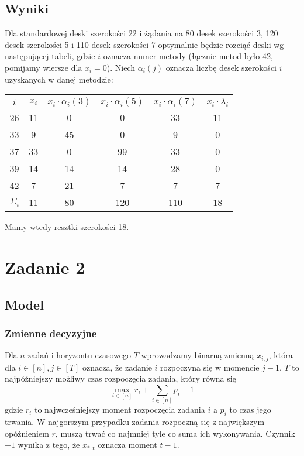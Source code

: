 \documentclass{article}
\begin{document}
\subsection{Wyniki}
Dla standardowej deski szerokości 22 i żądania na 80 desek szerokości 3, 120 desek szerokości 5 i 110 desek szerokości 7 optymalnie będzie rozciąć deski wg następującej tabeli, gdzie $i$ oznacza numer metody (łącznie metod było 42, pomijamy wiersze dla $x_i=0$). Niech $\alpha_i(j)$ oznacza liczbę desek szerokości $i$ uzyskanych w danej metodzie:
\begin{center}
\begin{tabular}{|c|c|c|c|c|c|}
\hline 
$i$ & $x_i$ & $x_i\cdot \alpha_i(3)$ & $x_i\cdot\alpha_i(5)$ & $x_i\cdot\alpha_i(7)$ & $x_i\cdot\lambda_i$ \\
\hline
26 & 11 & 0 & 0 & 33 & 11 \\
\hline
33 & 9 & 45 & 0 & 9 & 0 \\
\hline
37 & 33 & 0 & 99 & 33 & 0 \\
\hline
39 & 14 & 14 & 14 & 28 & 0 \\
\hline
42 & 7 & 21 & 7 & 7 & 7 \\
\hline
\hline
$\Sigma_i$ & 11 & 80 & 120 & 110 & 18 \\
\hline
\end{tabular}
\end{center}

Mamy wtedy resztki szerokości 18.

\section{Zadanie 2}
\subsection{Model}
\subsubsection{Zmienne decyzyjne}
Dla $n$ zadań i horyzontu czasowego $T$ wprowadzamy binarną zmienną $x_{i,j}$, która dla $i\in[n],j\in[T]$ oznacza, że zadanie $i$ rozpoczyna się w momencie $j-1$. $T$ to najpóźniejszy możliwy czas rozpoczęcia zadania, który równa się
$$\max_{i\in [n]} r_i + \sum_{i\in [n]} p_i + 1$$ 
gdzie $r_i$ to najwcześniejszy moment rozpoczęcia zadania $i$ a $p_i$ to czas jego trwania. W najgorszym przypadku zadania rozpoczną się z największym opóźnieniem $r$, muszą trwać co najmniej tyle co suma ich wykonywania. Czynnik $+1$ wynika z tego, że $x_{*,t}$ oznacza moment $t-1$.  
\end{document}
